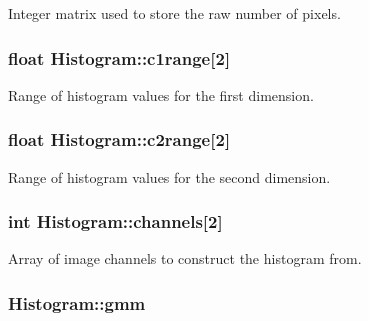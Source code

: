 \-Integer matrix used to store the raw number of pixels. 

\hypertarget{classHistogram_a86b67a4ddc798541c12cb9402a65790b}{
\subsubsection[{c1range}]{\setlength{\rightskip}{0pt plus 5cm}float {\bf \-Histogram\-::c1range}\mbox{[}2\mbox{]}}}\label{classHistogram_a86b67a4ddc798541c12cb9402a65790b}


\-Range of histogram values for the first dimension. 

\hypertarget{classHistogram_a0279598c0cef21107554447bbbfe22b6}{
\subsubsection[{c2range}]{\setlength{\rightskip}{0pt plus 5cm}float {\bf \-Histogram\-::c2range}\mbox{[}2\mbox{]}}}\label{classHistogram_a0279598c0cef21107554447bbbfe22b6}


\-Range of histogram values for the second dimension. 

\hypertarget{classHistogram_a2143ce56ddacb3295a8aa0e3ac8d06f7}{
\subsubsection[{channels}]{\setlength{\rightskip}{0pt plus 5cm}int {\bf \-Histogram\-::channels}\mbox{[}2\mbox{]}}}\label{classHistogram_a2143ce56ddacb3295a8aa0e3ac8d06f7}


\-Array of image channels to construct the histogram from. 

\hypertarget{classHistogram_a6006a95143aa084fd18e9db7c5525142}{
\subsubsection[{gmm}]{ {\bf \-Histogram\-::gmm}}}\label{classHistogram_a6006a95143aa084fd18e9db7c5525142}



